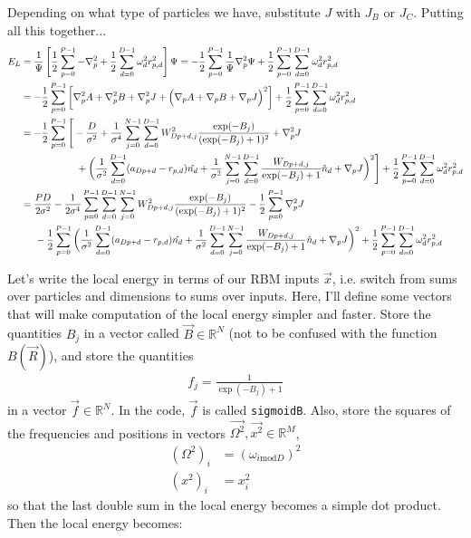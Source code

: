 \documentclass[12pt]{article}
\begin{document}
\noindent Depending on what type of particles we have, substitute $J$ with $J_B$ or $J_C$. Putting all this together...
\begin{align*}
E_L &= \frac{1}{\Psi} \left[ \frac{1}{2} \sum_{p=0}^{P-1} -\nabla_p^2 + \frac{1}{2}\sum_{d=0}^{D-1} \omega_d^2r_{p,d}^2 \right] \Psi = -\frac{1}{2} \sum_{p=0}^{P-1} \frac{1}{\Psi} \nabla_p^2 \Psi + \frac{1}{2} \sum_{p=0}^{P-1} \sum_{d=0}^{D-1} \omega_d^2r_{p,d}^2\\
&= -\frac{1}{2} \sum_{p=0}^{P-1} 
\bigg[ \nabla_p^2  A   + \nabla_p^2  B   + \nabla_p^2  J  + \Big( \nabla_p  A   + \nabla_p  B   + \nabla_p  J \Big)^2 \bigg]
+ \frac{1}{2} \sum_{p=0}^{P-1} \sum_{d=0}^{D-1} \omega_d^2r_{p,d}^2\\
&= -\frac{1}{2} \sum_{p=0}^{P-1} 
\Bigg[ -\frac{D}{\sigma^2}  
+ \frac{1}{\sigma^4} \sum_{j=0}^{N-1} \sum_{d=0}^{D-1} W_{Dp+d,j}^2 \frac{\exp(-B_j)}{(\exp(-B_j)+1)^2}
 + \nabla_p^2  J  \\
& \hspace*{20mm}+ \bigg( \frac{1}{\sigma^2} \sum_{d=0}^{D-1}(a_{Dp+d}-r_{p,d}) \hat{n_{d}}  + \frac{1}{\sigma^2} \sum_{j=0}^{N-1} \sum_{d=0}^{D-1} \frac{W_{Dp+d,j}}{\exp(-B_j)+1}  \hat{n}_d
 + \nabla_p  J \bigg)^2 \Bigg]
+ \frac{1}{2} \sum_{p=0}^{P-1} \sum_{d=0}^{D-1} \omega_d^2r_{p,d}^2\\
&= \frac{PD}{2\sigma^2} - \frac{1}{2\sigma^4} \sum_{p=0}^{P-1} \sum_{d=0}^{D-1} \sum_{j=0}^{N-1} W_{Dp+d,j}^2 \frac{\exp(-B_j)}{(\exp(-B_j)+1)^2} - \frac{1}{2} \sum_{p=0}^{P-1} \nabla_p^2  J\\
& \hspace*{5 mm} -\frac{1}{2} \sum_{p=0}^{P-1} \bigg( \frac{1}{\sigma^2} \sum_{d=0}^{D-1}(a_{Dp+d}-r_{p,d}) \hat{n_{d}}  + \frac{1}{\sigma^2} \sum_{d=0}^{D-1} \sum_{j=0}^{N-1} \frac{W_{Dp+d,j}}{\exp(-B_j)+1}  \hat{n}_d
 + \nabla_p  J \bigg)^2 + \frac{1}{2} \sum_{p=0}^{P-1} \sum_{d=0}^{D-1} \omega_d^2r_{p,d}^2\\
\end{align*}

\noindent Let's write the local energy in terms of our RBM inputs $\vec{x}$, i.e. switch from sums over particles and dimensions to sums over inputs. Here, I'll define some vectors that will make computation of the local energy simpler and faster. Store the quantities $B_j$ in a vector called $\vec{B} \in \mathbb{R}^N$ (not to be confused with the function $B(\vec{R})$), and store the quantities
\begin{align*}
f_{j} = \frac{1}{\exp(-B_j)+1}
\end{align*}
in a vector $\vec{f} \in \mathbb{R}^N$. In the code, $\vec{f}$ is called \texttt{sigmoidB}. Also, store the squares of the frequencies and positions in vectors $\vec{\Omega^2}, \vec{x^2} \in \mathbb{R}^M$,
\begin{align*}
(\Omega^2)_i &= (\omega_{i \text{mod} D})^2\\
(x^2)_i &= x_i^2
\end{align*}
so that the last double sum in the local energy becomes a simple dot product.
 Then the local energy becomes:
\end{document}
